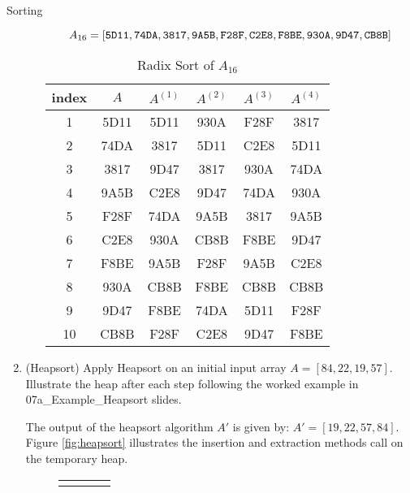 \documentclass{article}
\begin{document}
\begin{section}{Sorting}
\begin{enumerate}
\begin{enumerate}
        $$
        A_{16} = [{\tt 5D11, 74DA, 3817, 9A5B, F28F, C2E8, F8BE, 930A, 9D47, CB8B}]
        $$
        
        \begin{table}[h]
            \centering
            \begin{tabular}{|c||c|c|c|c|c|}
                \hline 
                index & $A$ & $A^{(1)}$ & $A^{(2)}$ & $A^{(3)}$ & $A^{(4)}$ \\
                \hline
                 1 & 5D11 & 5D11 & 930A & F28F & 3817 \\
                 2 & 74DA & 3817 & 5D11 & C2E8 & 5D11 \\
                 3 & 3817 & 9D47 & 3817 & 930A & 74DA \\
                 4 & 9A5B & C2E8 & 9D47 & 74DA & 930A \\
                 5 & F28F & 74DA & 9A5B & 3817 & 9A5B \\
                 6 & C2E8 & 930A & CB8B & F8BE & 9D47 \\
                 7 & F8BE & 9A5B & F28F & 9A5B & C2E8 \\
                 8 & 930A & CB8B & F8BE & CB8B & CB8B \\
                 9 & 9D47 & F8BE & 74DA & 5D11 & F28F \\
                10 & CB8B & F28F & C2E8 & 9D47 & F8BE \\
                \hline
            \end{tabular}
            \caption{Radix Sort of $A_{16}$}
            \label{tab:Radix Sort 16}
        \end{table}
    \end{enumerate}
    
    \item (Heapsort)
    Apply Heapsort on an initial input array $A = [84, 22, 19, 57]$. Illustrate the heap after each step following the worked example in 07a\_Example\_Heapsort slides.
    
    The output of the heapsort algorithm $A'$ is given by: $A' = [19, 22, 57, 84]$. Figure \ref{fig:heapsort} illustrates the insertion and extraction methods call on the temporary heap.
    \newpage
    
    \begin{figure}[h!]
    \centering
    \begin{tabular}{C{.20\linewidth}C{.20\linewidth}C{.20\linewidth}C{.20\linewidth}}
     & 
    

\end{tabular}
\end{figure}
\end{enumerate}
\end{section}
\end{document}
